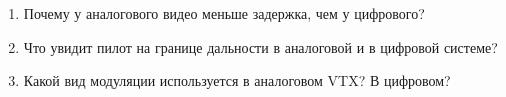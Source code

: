 
\begin{exam}
\begin{enumerate}
\item Почему у аналогового видео меньше задержка, чем у цифрового?
\item Что увидит пилот на границе дальности в аналоговой и в цифровой системе?
\item Какой вид модуляции используется в аналоговом VTX? В цифровом?
\end{enumerate}
\end{exam}
